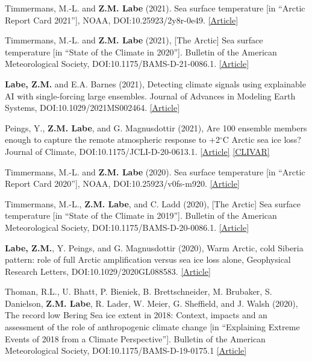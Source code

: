 \documentclass[margin,line,palatino,courier,10pt]{res}
\begin{document}
\begin{resume}
\begin{etaremune}[leftmargin=0in,topsep=0in,parsep=0in]
\item Timmermans, M.-L. and \textbf{Z.M. Labe} (2021). Sea surface temperature [in ``Arctic Report Card 2021''], NOAA, DOI:10.25923/2y8r-0e49. \href{https://www.arctic.noaa.gov/Report-Card/Report-Card-2021/ArtMID/8022/ArticleID/944/Sea-Surface-Temperature}{[Article]}
\item Timmermans, M.-L. and \textbf{Z.M. Labe} (2021), [The Arctic] Sea surface temperature [in ``State of the Climate in 2020'']. Bulletin of the American Meteorological Society, DOI:10.1175/BAMS-D-21-0086.1. \href{https://doi.org/10.1175/BAMS-D-21-0086.1}{[Article]}
\item \textbf{Labe, Z.M.} and E.A. Barnes (2021), Detecting climate signals using explainable AI with single-forcing large ensembles. Journal of Advances in Modeling Earth Systems, DOI:10.1029/2021MS002464. \href{https://agupubs.onlinelibrary.wiley.com/doi/abs/10.1029/2021MS002464}{[Article]}
\item Peings, Y., \textbf{Z.M. Labe}, and G. Magnusdottir (2021), Are 100 ensemble members enough to capture the remote atmospheric response to $+$2$^{\circ}$C Arctic sea ice loss? Journal of Climate, DOI:10.1175/JCLI-D-20-0613.1. \href{https://journals.ametsoc.org/view/journals/clim/aop/JCLI-D-20-0613.1/JCLI-D-20-0613.1.xml}{[Article]} \href{https://usclivar.org/research-highlights/how-reproducible-response-2degc-arctic-sea-ice-loss-large-ensemble-simulations}{[CLIVAR]}
\item Timmermans, M.-L. and \textbf{Z.M. Labe} (2020). Sea surface temperature [in ``Arctic Report Card 2020''], NOAA, DOI:10.25923/v0fs-m920. \href{https://arctic.noaa.gov/Report-Card/Report-Card-2020/ArtMID/7975/ArticleID/885/Sea-Surface-Temperature}{[Article]}
\item Timmermans, M.-L., \textbf{Z.M. Labe}, and C. Ladd (2020), [The Arctic] Sea surface temperature [in ``State of the Climate in 2019'']. Bulletin of the American Meteorological Society, DOI:10.1175/BAMS-D-20-0086.1. \href{https://doi.org/10.1175/BAMS-D-20-0086.1}{[Article]}
\item \textbf{Labe, Z.M.}, Y. Peings, and G. Magnusdottir (2020), Warm Arctic, cold Siberia pattern: role of full Arctic amplification versus sea ice loss alone, Geophysical Research Letters, DOI:10.1029/2020GL088583. \href{https://agupubs.onlinelibrary.wiley.com/doi/10.1029/2020GL088583}{[Article]}
\item Thoman, R.L., U. Bhatt, P. Bieniek, B. Brettschneider, M. Brubaker, S. Danielson, \textbf{Z.M. Labe}, R. Lader, W. Meier, G. Sheffield, and J. Walsh (2020), The record low Bering Sea ice extent in 2018: Context, impacts and an assessment of the role of anthropogenic climate change [in ``Explaining Extreme Events of 2018 from a Climate Perspective'']. Bulletin of the American Meteorological Society, DOI:10.1175/BAMS-D-19-0175.1 \href{https://journals.ametsoc.org/doi/abs/10.1175/BAMS-D-19-0175.1}{[Article]}

\end{etaremune}
\end{resume}
\end{document}
